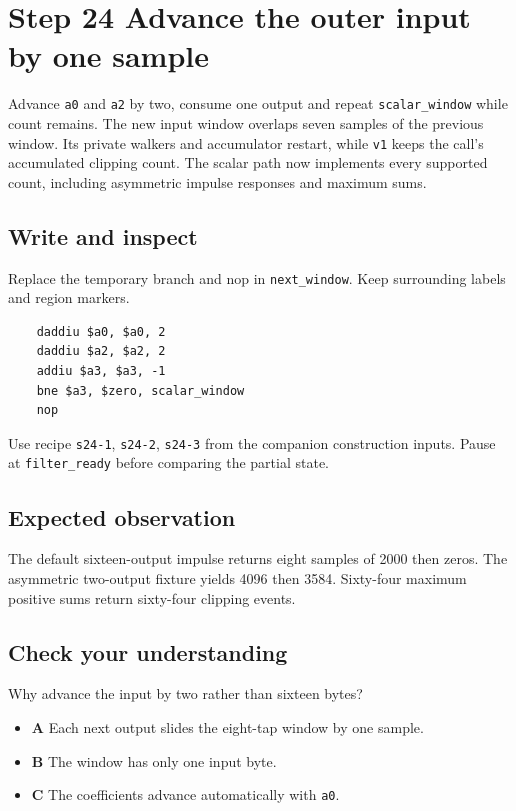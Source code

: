 \section{Step 24 Advance the outer input by one sample}\label{fir-s24}

Advance \texttt{a0} and \texttt{a2} by two, consume one output and repeat \texttt{scalar\_window} while count remains. The new input window overlaps seven samples of the previous window. Its private walkers and accumulator restart, while \texttt{v1} keeps the call’s accumulated clipping count. The scalar path now implements every supported count, including asymmetric impulse responses and maximum sums.

\subsection{Write and inspect}
Replace the temporary branch and nop in \texttt{next\_window}. Keep surrounding labels and region markers.

\begin{verbatim}
    daddiu $a0, $a0, 2
    daddiu $a2, $a2, 2
    addiu $a3, $a3, -1
    bne $a3, $zero, scalar_window
    nop
\end{verbatim}
Use recipe \texttt{s24-1}, \texttt{s24-2}, \texttt{s24-3} from the companion construction inputs. Pause at \texttt{filter\_ready} before comparing the partial state.

\subsection{Expected observation}
The default sixteen-output impulse returns eight samples of 2000 then zeros. The asymmetric two-output fixture yields 4096 then 3584. Sixty-four maximum positive sums return sixty-four clipping events.

\subsection{Check your understanding}
Why advance the input by two rather than sixteen bytes?

\begin{itemize}
  \item \textbf{A} Each next output slides the eight-tap window by one sample.
  \item \textbf{B} The window has only one input byte.
  \item \textbf{C} The coefficients advance automatically with \texttt{a0}.
\end{itemize}
